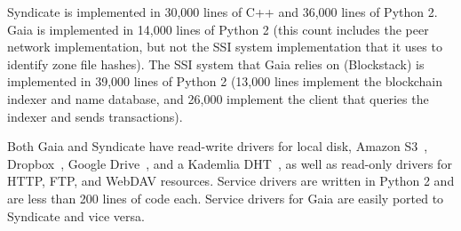 Syndicate is implemented in 30,000 lines of C++ and 36,000 lines of Python 2.
Gaia is implemented in 14,000 lines of Python 2 (this count includes the peer 
network implementation, but not the SSI system implementation that it uses to
identify zone file hashes).  The SSI system that Gaia relies on (Blockstack) is
implemented in 39,000 lines of Python 2 (13,000 lines implement the
blockchain indexer and name database, and 26,000 implement the client that
queries the indexer and sends transactions).

Both Gaia and Syndicate have read-write drivers for local disk, Amazon S3~\cite{s3}, 
Dropbox~\cite{dropbox}, Google Drive~\cite{gdrive}, and a Kademlia
DHT~\cite{kademlia}, as well as read-only drivers for HTTP, FTP, and WebDAV
resources.  Service drivers are written in Python 2 and are less than 200 lines of code
each.  Service drivers for Gaia are easily ported to Syndicate and vice versa.

